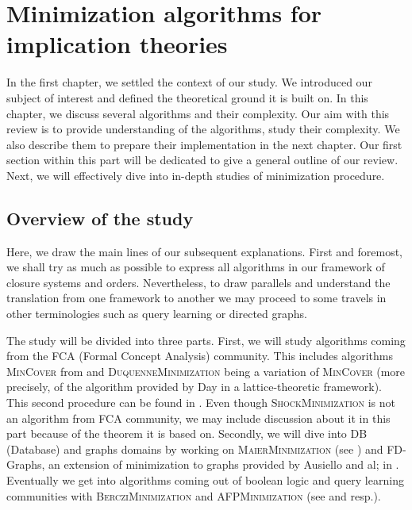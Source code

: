 \chapter{Minimization algorithms for implication theories}

In the first chapter, we settled the context of our study. We introduced our 
subject of interest and defined the theoretical ground it is built on. In this
chapter, we discuss several algorithms and their complexity. Our aim with this
review is to provide understanding of the algorithms, study their complexity.
We also describe them to prepare their implementation in the next chapter.  Our first section within this part will be dedicated to give a general outline of our review. Next, we will effectively dive into in-depth studies of minimization procedure. 


\section{Overview of the study}

Here, we draw the main lines of our subsequent explanations. First and foremost, we shall try as much as possible to express all algorithms in our framework of closure systems and orders. Nevertheless, to draw parallels
and understand the translation from one framework to another we may proceed to 
some travels in other terminologies such as query learning or directed graphs.

\vspace{1.2em}

The study will be divided into three parts. First, we will study algorithms 
coming from the FCA (Formal Concept Analysis) community. This includes 
algorithms \textsc{MinCover} from \cite{bazhanov_optimizations_2014, day_lattice_1992, wild_implicational_1989} and \textsc{DuquenneMinimization}
being a variation of \textsc{MinCover} (more precisely, of the algorithm
provided by Day in a lattice-theoretic framework). This second procedure can
be found in \cite{duquenne_variations_2007}. Even though \textsc{ShockMinimization} is not an algorithm from FCA community, we may include discussion about it in this part because of the theorem it is based on. Secondly, we will dive into DB (Database) and graphs domains by working on
\textsc{MaierMinimization} (see \cite{maier_theory_1983, maier_minimum_1980}) and FD-Graphs, an extension of minimization to graphs provided by Ausiello and al; in \cite{ausiello_graph_1983, ausiello_minimal_1986, ausiello_directed_2017}. Eventually we get into algorithms coming out of 
boolean logic and query learning communities with \textsc{BercziMinimization}
and \textsc{AFPMinimization} (see \cite{berczi_directed_2017} and \cite{angluin_learning_1992, arias_canonical_2009} resp.).

